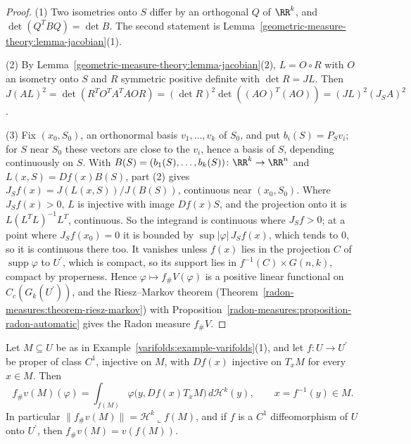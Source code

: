 \begin{proof}
(1) Two isometries onto $S$ differ by an orthogonal $Q$ of $\RR^k$, and $\det(Q^TBQ) = \det B$. The second statement is Lemma~\ref{geometric-measure-theory:lemma-jacobian}(1).

(2) By Lemma~\ref{geometric-measure-theory:lemma-jacobian}(2), $L = O \circ R$ with $O$ an isometry onto $S$ and $R$ symmetric positive definite with $\det R = JL$. Then
$J(AL)^2 = \det(R^TO^TA^TAOR) = (\det R)^2\det((AO)^T(AO)) = (JL)^2(J_SA)^2$.

(3) Fix $(x_0, S_0)$, an orthonormal basis $v_1, \ldots, v_k$ of $S_0$, and put $b_i(S) = P_Sv_i$; for $S$ near $S_0$ these vectors are close to the $v_i$, hence a basis of $S$, depending continuously on
$S$. With $B(S) = (b_1(S), \ldots, b_k(S)) \colon \RR^k \to \RR^n$ and $L(x, S) = Df(x)B(S)$, part (2) gives $J_Sf(x) = J(L(x, S))/J(B(S))$, continuous near $(x_0, S_0)$. Where $J_Sf(x) > 0$, $L$ is
injective with image $Df(x)S$, and the projection onto it is $L(L^TL)^{-1}L^T$, continuous. So the integrand is continuous where $J_Sf > 0$; at a point where $J_Sf(x_0) = 0$ it is bounded by
$\sup|\varphi|\,J_Sf(x)$, which tends to $0$, so it is continuous there too. It vanishes unless $f(x)$ lies in the projection $C$ of $\operatorname{supp}\varphi$ to $U^{\prime}$, which is compact, so its
support lies in $f^{-1}(C) \times G(n, k)$, compact by properness. Hence $\varphi \mapsto f_\#V(\varphi)$ is a positive linear functional on $C_c(G_k(U^{\prime}))$, and the Riesz--Markov theorem
(Theorem~\ref{radon-measures:theorem-riesz-markov}) with Proposition~\ref{radon-measures:proposition-radon-automatic} gives the Radon measure $f_\#V$.
\end{proof}

\begin{proposition}\label{varifolds:proposition-push-forward-submanifold}
Let $M \subseteq U$ be as in Example~\ref{varifolds:example-varifolds}(1), and let $f \colon U \to U^{\prime}$ be proper of class $C^1$, injective on $M$, with $Df(x)$ injective on $T_xM$ for every $x \in M$.
Then
\[
f_\#v(M)(\varphi) = \int_{f(M)}\varphi\bigl(y, Df(x)T_xM\bigr)\,d\mathcal{H}^k(y), \qquad x = f^{-1}(y) \in M .
\]
In particular $\|f_\#v(M)\| = \mathcal{H}^k\llcorner f(M)$, and if $f$ is a $C^1$ diffeomorphism of $U$ onto $U^{\prime}$, then $f_\#v(M) = v(f(M))$.
\end{proposition}

